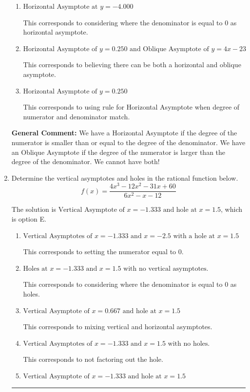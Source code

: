 \documentclass{extbook}[14pt]
\newcommand{\litem}[1]{\item #1

\rule{\textwidth}{0.4pt}}
\begin{document}
\begin{enumerate}
{\begin{enumerate}[label=\Alph*.]
* This is the correct option.
\item \( \text{Horizontal Asymptote at } y = -4.000 \)

This corresponds to considering where the denominator is equal to 0 as horizontal asymptote.
\item \( \text{Horizontal Asymptote of } y = 0.250 \text{ and Oblique Asymptote of } y = 4x -23 \)

This corresponds to believing there can be both a horizontal and oblique asymptote.
\item \( \text{Horizontal Asymptote of } y = 0.250  \)

This corresponds to using rule for Horizontal Asymptote when degree of numerator and denominator match.
\end{enumerate}

\textbf{General Comment:} We have a Horizontal Asymptote if the degree of the numerator is smaller than or equal to the degree of the denominator. We have an Oblique Asymptote if the degree of the numerator is larger than the degree of the denominator. We cannot have both!
}
\litem{
Determine the vertical asymptotes and holes in the rational function below.
\[ f(x) = \frac{4x^{3} -12 x^{2} -31 x + 60}{6x^{2} -x -12} \]

The solution is \( \text{Vertical Asymptote of } x = -1.333 \text{ and hole at } x = 1.5 \), which is option E.\begin{enumerate}[label=\Alph*.]
\item \( \text{Vertical Asymptotes of } x = -1.333 \text{ and } x = -2.5 \text{ with a hole at } x = 1.5 \)

This corresponds to setting the numerator equal to 0.
\item \( \text{Holes at } x = -1.333 \text{ and } x = 1.5 \text{ with no vertical asymptotes.} \)

This corresponds to considering where the denominator is equal to 0 as holes.
\item \( \text{Vertical Asymptote of } x = 0.667 \text{ and hole at } x = 1.5 \)

This corresponds to mixing vertical and horizontal asymptotes.
\item \( \text{Vertical Asymptotes of } x = -1.333 \text{ and } x = 1.5 \text{ with no holes.} \)

This corresponds to not factoring out the hole.
\item \( \text{Vertical Asymptote of } x = -1.333 \text{ and hole at } x = 1.5 \)


\end{enumerate}}
\end{enumerate}
\end{document}
